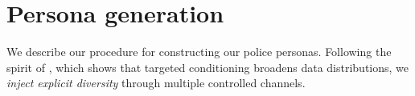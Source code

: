 \documentclass[11pt]{article}
\begin{document}



\section{Persona generation}\label{sec:automatic_persona_creation}

We describe our procedure for constructing our police personas. Following the spirit of \citet{structured_attr_prompt}, which shows that targeted conditioning broadens data distributions, we \emph{inject explicit diversity} through multiple controlled channels.
\end{document}
